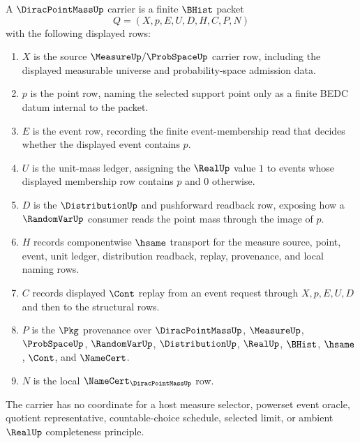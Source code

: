\begin{definition}
\label{def:dirac-point-mass-carrier}
A $\DiracPointMassUp$ carrier is a finite $\BHist$ packet
$$
Q=(X,p,E,U,D,H,C,P,N)
$$
with the following displayed rows:
\begin{enumerate}
\item $X$ is the source $\MeasureUp/\ProbSpaceUp$ carrier row, including the displayed measurable universe and probability-space admission data.
\item $p$ is the point row, naming the selected support point only as a finite BEDC datum internal to the packet.
\item $E$ is the event row, recording the finite event-membership read that decides whether the displayed event contains $p$.
\item $U$ is the unit-mass ledger, assigning the $\RealUp$ value $1$ to events whose displayed membership row contains $p$ and $0$ otherwise.
\item $D$ is the $\DistributionUp$ and pushforward readback row, exposing how a $\RandomVarUp$ consumer reads the point mass through the image of $p$.
\item $H$ records componentwise $\hsame$ transport for the measure source, point, event, unit ledger, distribution readback, replay, provenance, and local naming rows.
\item $C$ records displayed $\Cont$ replay from an event request through $X,p,E,U,D$ and then to the structural rows.
\item $P$ is the $\Pkg$ provenance over $\DiracPointMassUp$, $\MeasureUp$, $\ProbSpaceUp$, $\RandomVarUp$, $\DistributionUp$, $\RealUp$, $\BHist$, $\hsame$, $\Cont$, and $\NameCert$.
\item $N$ is the local $\NameCert_{\DiracPointMassUp}$ row.
\end{enumerate}
The carrier has no coordinate for a host measure selector, powerset event oracle, quotient representative, countable-choice schedule, selected limit, or ambient $\RealUp$ completeness principle.
\end{definition}

